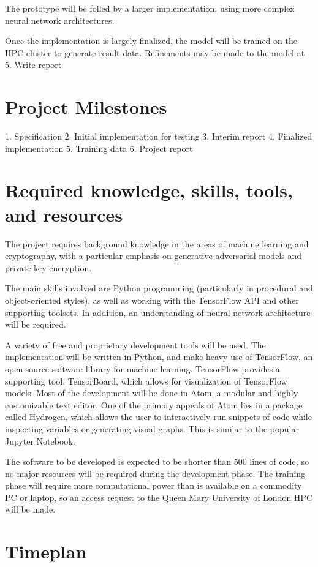 \documentclass[12pt, titlepage]{article}
\begin{document}
The prototype will be folled by a larger implementation, using more complex
neural network architectures.

Once the implementation is largely finalized, the model will be trained on the
HPC cluster to generate result data. Refinements may be made to the model at
5. Write report


\section{Project Milestones}
1. Specification
2. Initial implementation for testing
3. Interim report
4. Finalized implementation
5. Training data
6. Project report


\section{Required knowledge, skills, tools, and resources}
The project requires background knowledge in the areas of machine learning
and cryptography, with a particular emphasis on generative adversarial
models and private-key encryption.

The main skills involved are Python programming (particularly in procedural
and object-oriented styles), as well as working with the TensorFlow API and
other supporting toolsets. In addition, an understanding of neural network
architecture will be required.

A variety of free and proprietary development tools will be used. The
implementation will be written in Python, and make heavy use of TensorFlow,
an open-source software library for machine learning. TensorFlow provides
a supporting tool, TensorBoard, which allows for visualization of TensorFlow
models. Most of the development will be done in Atom, a modular and highly
customizable text editor. One of the primary appeals of Atom lies in a
package called Hydrogen, which allows the user to interactively run
snippets of code while inspecting variables or generating visual graphs. This
is similar to the popular Jupyter Notebook.

The software to be developed is expected to be shorter than 500 lines of code,
so no major resources will be required during the development phase. The
training phase will require more computational power than is available on a
commodity PC or laptop, so an access request to the Queen Mary University of
London HPC will be made.


\section{Timeplan}
\end{document}
